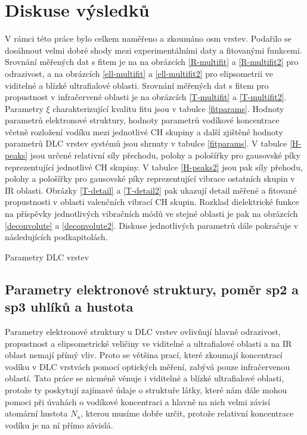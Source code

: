 \chapter{Diskuse výsledků}
V rámci této práce bylo celkem naměřeno a zkoumáno osm vrstev. Podařilo se dosáhnout velmi dobré shody mezi experimentálními daty a fitovanými funkcemi. Srovnání měřených dat s fitem je na na obrázcích \ref{R-multifit} a \ref{R-multifit2} pro odrazivost, a na obrázcích \ref{ell-multifit} a \ref{ell-multifit2} pro elipsometrii ve viditelné a blízké ultrafialové oblasti.  Srovnání měřených dat s fitem pro propustnost v infračervené oblasti je na obrázcích \ref{T-multifit} a \ref{T-multifit2}. Parametry $\xi$ charakterizující kvalitu fitu jsou v tabulce \ref{fitparams}. Hodnoty parametrů elektronové struktury, hodnoty parametrů vodíkové koncentrace včetně rozložení vodíku mezi jednotlivé CH skupiny a další zjištěné hodnoty parametrů DLC vrstev systémů jsou shrnuty v tabulce \ref{fitparams}. 
V tabulce \ref{H-peaks} jsou určené relativní síly přechodu, polohy a pološířky pro gausovské píky reprezentující jednotlivé CH skupiny. V tabulce \ref{H-peaks2} jsou pak síly přehodu, polohy a pološířky pro gausovské píky reprezentující vibrace ostatních skupin v IR oblasti.
Obrázky \ref{T-detail} a \ref{T-detail2} pak ukazují detail měřené a fitované propustnosti v oblasti valenčních vibrací CH skupin. Rozklad dielektrické funkce na příspěvky jednotlivých vibračních módů ve stejné oblasti je pak na obrázcích \ref{deconvolute} a \ref{deconvolute2}. Diskuse jednotlivých parametrů dále pokračuje v následujících podkapitolách.

\begin{table}[tbhp]
 \centering
	\renewcommand{\tabcolsep}{4pt}
 
 \caption{Parametry DLC vrstev}
\label{fitparams}
\end{table}

\section{Parametry elektronové struktury, poměr sp2 a sp3 uhlíků a hustota}
Parametry elektronové struktury u DLC vrstev ovlivňují hlavně odrazivost, propustnost a elipsometrické veličiny ve viditelné a ultrafialové oblasti a na IR oblast nemají přímý vliv. 
Proto se většina prací, které zkoumají koncentrací vodíku v DLC vrstvách pomocí optických měření, zabývá pouze infračervenou oblastí. Tato práce se nicméně věnuje i viditelné a blízké ultrafialové oblasti, protože ty poskytují zajímavé údaje o struktuře látky, které nám dále mohou pomoci při úvahách o vodíkové koncentraci a hlavně na nich velmi závisí atomární hustota $N_\mathrm{a}$, kterou musíme dobře určit, protože relativní koncentrace vodíku je na ní přímo závislá.  

